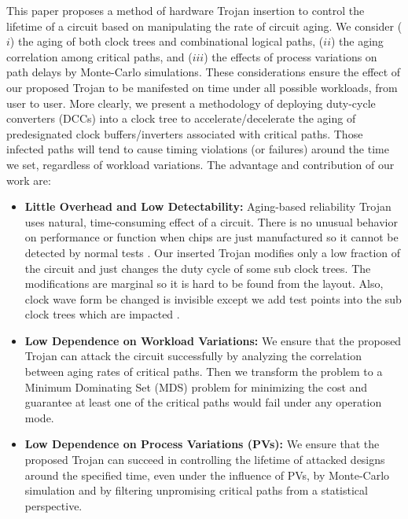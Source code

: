 This paper proposes a method of hardware Trojan insertion to control the lifetime of a circuit based on manipulating the rate of circuit aging. We consider ($i$) the aging of both clock trees and combinational logical paths, ($ii$) the aging correlation among critical paths, and ($iii$) the effects of process variations on path delays by Monte-Carlo simulations.  These considerations ensure the effect of our proposed Trojan to be manifested on time under all possible workloads, from user to user. More clearly, we present a methodology of deploying duty-cycle converters (DCCs) into a clock tree to accelerate/decelerate the aging of predesignated clock buffers/inverters associated with critical paths. Those infected paths will tend to cause timing violations (or failures) around the time we set, regardless of workload variations. The advantage and contribution of our work are:
\begin{itemize}[leftmargin=*]
	\item \textbf{Little Overhead and Low Detectability:} Aging-based reliability Trojan uses natural, time-consuming effect of a circuit. There is no unusual behavior on performance or function when chips are just manufactured so it cannot be detected by normal tests \cite{sreedhar2012reliability}. Our inserted Trojan modifies only a low fraction of the circuit and just changes the duty cycle of some sub clock trees. The modifications are marginal so it is hard to be found from the layout. Also, clock wave form be changed is invisible except we add test points into the sub clock trees which are impacted \cite{sreedhar2012reliability}.
	\item \textbf{Low Dependence on Workload Variations:} We ensure that the proposed Trojan can attack the circuit successfully by analyzing the correlation between aging rates of critical paths. Then we transform the problem to a Minimum Dominating Set (MDS) problem for minimizing the cost and guarantee at least one of the critical paths would fail under any operation mode.
	\item \textbf{Low Dependence on Process Variations (PVs):} We ensure that the proposed Trojan can succeed in controlling the lifetime of attacked designs around the specified time, even under the influence of PVs, by Monte-Carlo simulation and by filtering unpromising critical paths from a statistical perspective. 
\end{itemize}
